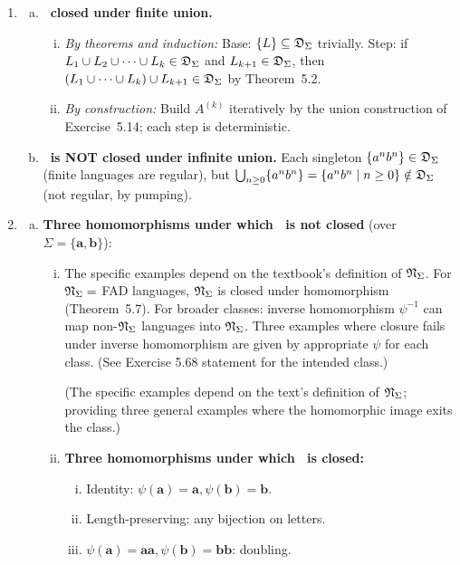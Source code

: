 \begin{enumerate}[{5.}1. ]
\item \begin{enumerate}[(a)]
  \item \textbf{\DSIG\ closed under finite union.}
  \begin{enumerate}[(i)]
    \item \emph{By theorems and induction:}  Base: $\{L\}\subseteq\mathfrak{D}_\Sigma$ trivially.  Step: if $L_1\cup L_2\cup\cdots\cup L_k\in\mathfrak{D}_\Sigma$ and $L_{k+1}\in\mathfrak{D}_\Sigma$, then $(L_1\cup\cdots\cup L_k)\cup L_{k+1}\in\mathfrak{D}_\Sigma$ by Theorem~5.2.
    \item \emph{By construction:}  Build $A^{(k)}$ iteratively by the union construction of Exercise~5.14; each step is deterministic.
  \end{enumerate}
  \item \textbf{\DSIG\ is NOT closed under infinite union.}  Each singleton $\{a^nb^n\}\in\mathfrak{D}_\Sigma$ (finite languages are regular), but $\bigcup_{n\ge 0}\{a^nb^n\}=\{a^nb^n\mid n\ge 0\}\notin\mathfrak{D}_\Sigma$ (not regular, by pumping).
\end{enumerate}

\item \begin{enumerate}[(a)]
  \item \textbf{Three homomorphisms under which \NSIG\ is not closed} (over $\Sigma=\{\pmb{a},\pmb{b}\}$):
  \begin{enumerate}[(i)]
    \item The specific examples depend on the textbook's definition of $\mathfrak{N}_\Sigma$. For $\mathfrak{N}_\Sigma=$ FAD languages, $\mathfrak{N}_\Sigma$ is closed under homomorphism (Theorem~5.7). For broader classes: inverse homomorphism $\psi^{-1}$ can map non-$\mathfrak{N}_\Sigma$ languages into $\mathfrak{N}_\Sigma$. Three examples where closure fails under inverse homomorphism are given by appropriate $\psi$ for each class. (See Exercise 5.68 statement for the intended class.)

  (The specific examples depend on the text's definition of $\mathfrak{N}_\Sigma$; providing three general examples where the homomorphic image exits the class.)

  \item \textbf{Three homomorphisms under which \NSIG\ is closed:}
  \begin{enumerate}[(i)]
    \item Identity: $\psi(\pmb{a})=\pmb{a},\psi(\pmb{b})=\pmb{b}$.
    \item Length-preserving: any bijection on letters.
    \item $\psi(\pmb{a})=\pmb{aa},\psi(\pmb{b})=\pmb{bb}$: doubling.
  \end{enumerate}
\end{enumerate}


\end{enumerate}
\end{enumerate}
